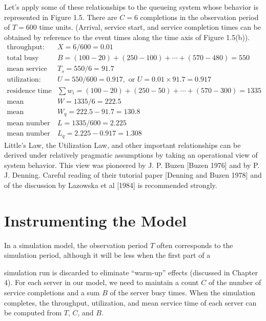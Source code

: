 Let's apply some of these relationships to the queueing system whose behavior
is represented in Figure 1.5. There are $C=6$ completions in the observation
period of $T=600$ time units. (Arrival, service start, and service completion
times can be obtained by reference to the event times along the time axis of
Figure 1.5(b)).
{\small
\begin{align*}
\text{throughput:}\quad & X=6/600=0.01\\
\text{total busy time:}\quad & B=(100-20)+(250-100)+\cdots+(570-480)=550\\
\text{mean service time:}\quad & T_s=550/6=91.7\\
\text{utilization:}\quad & U=550/600=0.917,\text{ or }U=0.01\times91.7=0.917\\
\text{residence time sum:}\quad & \sum w_i=(100-20)+(250-50)+\cdots+(570-300)=1335\\
\text{mean residence time:}\quad & W=1335/6=222.5\\
\text{mean queueing time:}\quad & W_q=222.5-91.7=130.8\\
\text{mean number in system:}\quad & L=1335/600=2.225\\
\text{mean number in queue:}\quad & L_q=2.225-0.917=1.308
\end{align*}
}
Little's Law, the Utilization Law, and other important relationships can be
derived under relatively pragmatic assumptions by taking an operational view of
system behavior. This view was pioneered by J. P. Buzen [Buzen 1976] and by
P. J. Denning. Careful reading of their tutorial paper [Denning and Buzen 1978]
and of the discussion by Lazowska et al [1984] is recommended strongly.

\section{Instrumenting the Model}
\label{sec:instrumenting-the-model}
In a simulation model, the observation period $T$ often corresponds to the
simulation period, although it will be less when the first part of a

\noindent simulation run is discarded to eliminate ``warm-up'' effects (discussed in
Chapter 4). For each server in our model, we need to maintain a count $C$ of the
number of service completions and a sum $B$ of the server busy times. When the
simulation completes, the throughput, utilization, and mean service time of
each server can be computed from $T$, $C$, and $B$.

